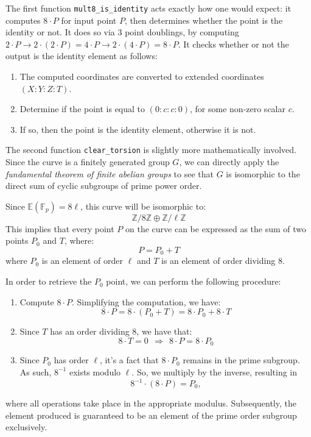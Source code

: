 \documentclass[12pt,titlepage,table]{article}
\begin{document}
The first function \verb+mult8_is_identity+ acts exactly how one would expect: it computes $8 \cdot P$ for  input point $P$, then determines whether the point is the identity or not. It does so via 3 point doublings, by computing $2 \cdot P \rightarrow 2 \cdot (2 \cdot P) = 4 \cdot P \rightarrow 2 \cdot (4 \cdot P) = 8 \cdot P$. It checks whether or not the output is the identity element as follows:
\begin{enumerate}
    \item The computed coordinates are converted to extended coordinates $(X:Y:Z:T)$.
    \item Determine if the point is equal to $(0:c:c:0)$, for some non-zero scalar $c$.
    \item If so, then the point is the identity element, otherwise it is not.
\end{enumerate}

\medskip
The second function \verb+clear_torsion+ is slightly more mathematically involved. Since the curve is a finitely generated group $G$, we can directly apply the \textit{fundamental theorem of finite abelian groups} to see that $G$ is isomorphic to the direct sum of cyclic subgroups of prime power order.

\medskip
Since $\mathbb{E}(\mathbb{F}_p) = 8 \ell$, this curve will be isomorphic to: $$\mathbb{Z}/8\mathbb{Z} \oplus \mathbb{Z}/ \ell \mathbb{Z}$$
This implies that every point $P$ on the curve can be expressed as the sum of two points $P_0$ and $T$, where:
$$P = P_0 + T$$
where $P_0$ is an element of order $\ell$ and $T$ is an element of order dividing $8$.

\medskip
In order to retrieve the $P_0$ point, we can perform the following procedure:
\begin{enumerate}
    \item Compute $8 \cdot P$. Simplifying the computation, we have:
    $$8 \cdot P = 8 \cdot (P_0 + T) = 8 \cdot P_0 + 8 \cdot T$$
    \item Since $T$ has an order dividing $8$, we have that:
    $$8 \cdot T = 0  \ \ \Rightarrow \ \ 8 \cdot P = 8 \cdot P_0$$
    \item Since $P_0$ has order $\ell$, it's a fact that $8 \cdot P_0$ remains in the prime subgroup. As such, $8^{-1}$ exists modulo $\ell$. So, we multiply by the inverse, resulting in
    $$8^{-1} \cdot (8 \cdot P) = P_0,$$
\end{enumerate}
where all operations take place in the appropriate modulus. Subsequently, the element produced is guaranteed to be an element of the prime order subgroup exclusively.
\end{document}
